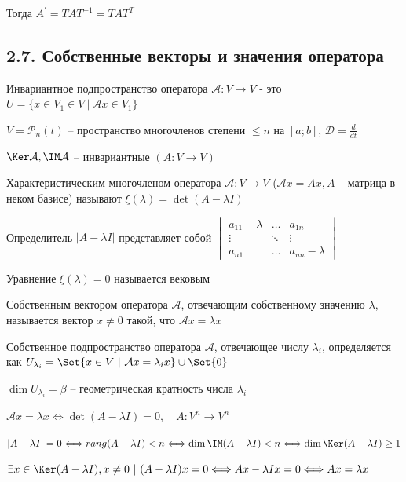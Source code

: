 \documentclass[12pt]{article}
\begin{document}
    \Nota Тогда $A^\prime = T A T^{-1} = T A T^T$


    \subsection[p2\_7]{2.7. Собственные векторы и значения оператора}

    \Def Инвариантное подпространство оператора $\mathcal{A} : V \rightarrow V$ -
    это $U = \{x \in V_1 \in V \ | \ \mathcal{A}x \in V_1\}$

    \Ex $V = \mathcal{P}_n(t)$ -- пространство многочленов степени $\leq n$ на $[a; b]$, $\mathcal{D} = \frac{d}{dt}$

    \Nota $\Ker \mathcal{A}, \IM \mathcal{A}$ -- инвариантные $(A : V \rightarrow V)$

    \hypertarget{eigenvalue}{}

    \Def Характеристическим многочленом оператора $\mathcal{A} : V \rightarrow V$
    ($\mathcal{A}x = Ax, A$ -- матрица в неком базисе) называют $\xi(\lambda) = \det(A - \lambda I)$

    \Nota Определитель $|A - \lambda I|$ представляет собой $\begin{vmatrix}a_{11} - \lambda & \dots & a_{1n} \\ \vdots & \ddots & \vdots \\ a_{n1} & \dots & a_{nn} - \lambda \end{vmatrix}$

    \Nota Уравнение $\xi(\lambda) = 0$ называется вековым

    \hypertarget{eigenvector}{}

    \Def Собственным вектором оператора $\mathcal{A}$, отвечающим собственному значению $\lambda$,
    называется вектор $x \neq 0$ такой, что $\mathcal{A}x = \lambda x$

    \Defs Собственное подпространство оператора $\mathcal{A}$, отвечающее числу $\lambda_i$, определяется как $U_{\lambda_i} = \Set{x \in V \ | \ \mathcal{A}x = \lambda_i x} \union \Set{0}$

    \Defs $\dim U_{\lambda_i} = \beta$ -- геометрическая кратность числа $\lambda_i$

    \begin{MyTheorem}
        \Ths $\mathcal{A}x = \lambda x \Longleftrightarrow \det(A - \lambda I) = 0, \quad A : V^n \rightarrow V^n$
    \end{MyTheorem}

    \begin{MyProof}
        $|A - \lambda I| = 0 \Longleftrightarrow rang (A - \lambda I) < n \Longleftrightarrow
        \dim \IM (A - \lambda I) < n \Longleftrightarrow \dim \Ker (A - \lambda I) \geq 1$

        $\exists x \in \Ker (A - \lambda I), x \neq 0 \ | \ (A - \lambda I) x = 0 \Longleftrightarrow Ax - \lambda I x = 0 \Longleftrightarrow Ax = \lambda x$
    \end{MyProof}
\end{document}
